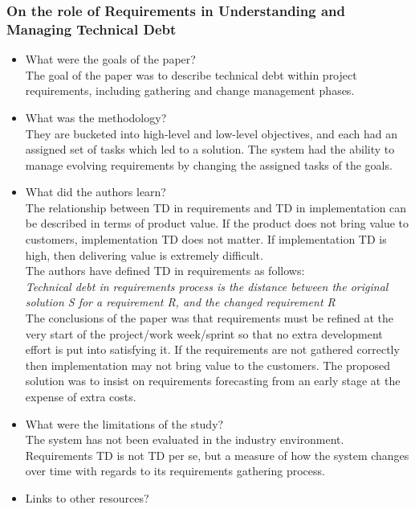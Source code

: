 \documentclass{mprop}
\begin{document}
\subsubsection{On the role of Requirements in Understanding and Managing Technical Debt} \cite{Ernst2012}
\begin{itemize}
\item What were the goals of the paper? \\
The goal of the paper was to describe technical debt within project requirements, including gathering and change management phases.
\item What was the methodology?\\
They are bucketed into high-level and low-level objectives, and each had an assigned set of tasks which led to a solution.
The system had the ability to manage evolving requirements by changing the assigned tasks of the goals.
\item What did the authors learn?\\
The relationship between TD in requirements and TD in implementation can be described in terms of product value.
If the product does not bring value to customers, implementation TD does not matter. 
If implementation TD is high, then delivering value is extremely difficult.\\
The authors have defined TD in requirements as follows:\\
\textit{Technical debt in requirements process is the distance between the original solution S for a requirement R, and the changed requirement R} \\
The conclusions of the paper was that requirements must be refined at the very start of the project/work week/sprint so that no extra development effort is put into satisfying it.
If the requirements are not gathered correctly then implementation may not bring value to the customers.
The proposed solution was to insist on requirements forecasting from an early stage at the expense of extra costs.
\item What were the limitations of the study?\\
The system has not been evaluated in the industry environment.\\
Requirements TD is not TD per se, but a measure of how the system changes over time with regards to its requirements gathering process.
\item Links to other resources? \\
\end{itemize}
\end{document}
